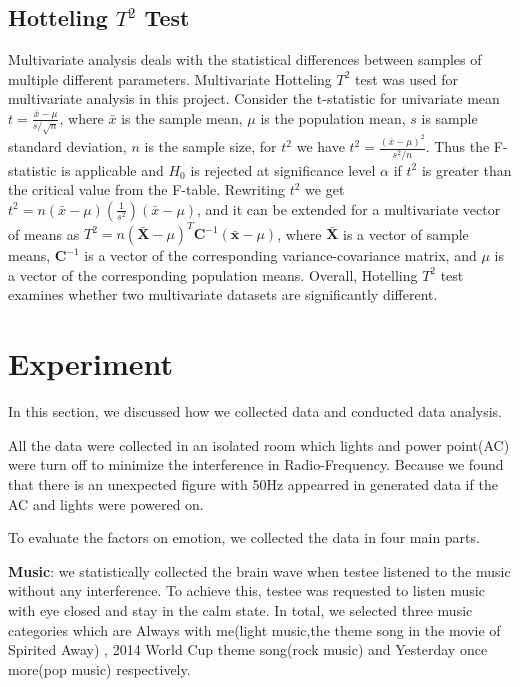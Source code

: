 \documentclass[letterpaper,twocolumn,10pt]{article}
\begin{document}
\subsection{Hotteling $T^2$ Test}

Multivariate analysis deals with the statistical differences between samples of multiple different parameters. Multivariate Hotteling $T^2$ test was used for multivariate analysis in this project. Consider the t-statistic for univariate mean $t=\frac{\bar{x}-\mu}{s/\sqrt{n}}$, where $\bar{x}$ is the sample mean, $\mu$  is the population mean, $s$ is sample standard deviation, $n$ is the sample size, for $t^2$ we have $t^2=\frac{(\bar{x}-\mu)^2}{s^2/n}$. Thus the F-statistic is applicable and $H_0$ is rejected at significance level $\alpha$ if $t^2$ is greater than the critical value from the F-table. Rewriting $t^2$ we get $t^2=n(\bar{x}-\mu)\left( \frac{1}{s^2}\right) (\bar{x}-\mu)$, and it can be extended for a multivariate vector of means as $T^2=n(\bm{\bar{X}}-\mu)^T\bm{C}^{-1}(\bm{\bar{x}}-\mu)$, where $\bm{\bar{X}}$ is a vector of sample means, $\bm{C}^{-1}$ is a vector of the corresponding variance-covariance matrix, and $\mu$ is a vector of the corresponding population means. Overall, Hotelling $T^2$ test examines whether two multivariate datasets are significantly different.


\section{Experiment}
In this section, we discussed how we collected data and conducted data analysis.

All the data were collected in an isolated room which lights and power point(AC) were turn off to minimize the interference in Radio-Frequency. Because we found that there is an unexpected figure with 50Hz appearred in generated data if the AC and lights were powered on.

To evaluate the factors on emotion, we collected the data in four main parts.

\noindent
{}
\setlength{\hangindent}{1em}
\textbf{Music}: we statistically collected the brain wave when testee listened to the music without any interference. To achieve this, testee was requested to listen music with eye closed and stay in the calm state. In total, we selected three music categories which are Always with me(light music,the theme song in the movie of Spirited Away) , 2014 World Cup theme song(rock music) and Yesterday once more(pop music) respectively.
\end{document}

